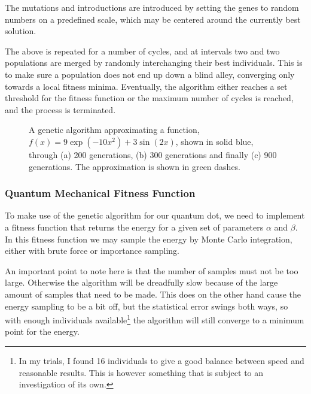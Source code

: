 \documentclass[aps,prb,twocolumn,floatfix]{revtex4}
\begin{document}
The mutations and introductions are introduced by setting the genes to random numbers on a predefined scale, which may be centered around the currently best solution.

The above is repeated for a number of cycles, and at intervals two and two populations are merged by randomly interchanging their best individuals. This is to make sure a population does not end up down a blind alley, converging only towards a local fitness minima. Eventually, the algorithm either reaches a set threshold for the fitness function or the maximum number of cycles is reached, and the process is terminated.

\begin{figure*}
    \centering
     \label{sub:fitness200}
     \label{sub:fitness300}
     \label{sub:fitness900}
    \caption{A genetic algorithm approximating a function, $f(x) = 9 \exp(- 10 x^{2}) + 3 \sin(2x)$, shown in solid blue, through (a) 200 generations, (b) 300 generations and finally (c) 900 generations. The approximation is shown in green dashes.}
    \label{fig:fitnesstest}
\end{figure*}

\subsubsection{Quantum Mechanical Fitness Function}

To make use of the genetic algorithm for our quantum dot, we need to implement a fitness function that returns the energy for a given set of parameters $\alpha$ and $\beta$. In this fitness function we may sample the energy by Monte Carlo integration, either with brute force or importance sampling.

An important point to note here is that the number of samples must not be too large. Otherwise the algorithm will be dreadfully slow because of the large amount of samples that need to be made. This does on the other hand cause the energy sampling to be a bit off, but the statistical error swings both ways, so with enough individuals available\footnote{In my trials, I found 16 individuals to give a good balance between speed and reasonable results. This is however something that is subject to an investigation of its own.} the algorithm will still converge to a minimum point for the energy.
\end{document}
